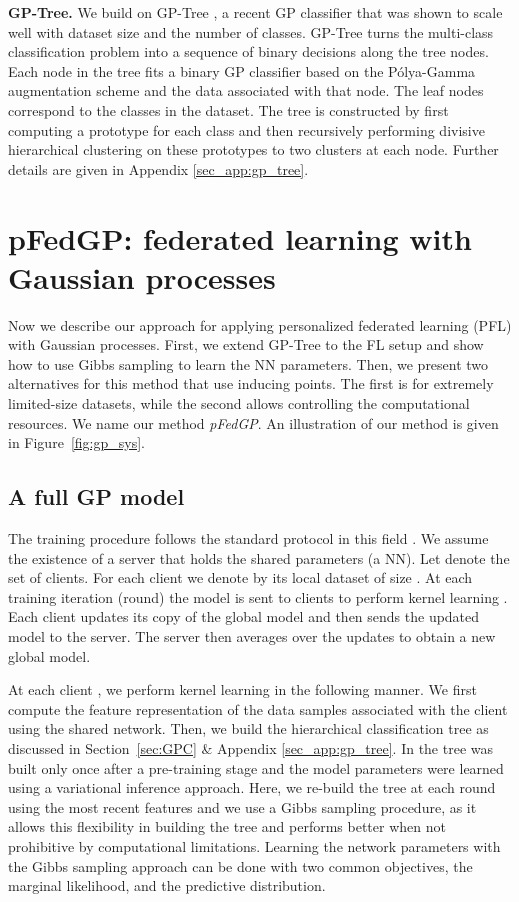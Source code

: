 \documentclass{article}
\def\Figref#1{Figure~\ref{#1}}
\def\Secref#1{Section~\ref{#1}}
\newcommand{\pg}{P\'olya-Gamma }
\begin{document}
\textbf{GP-Tree.} 
We build on GP-Tree \cite{achituve2021gp_icml}, a recent GP classifier that was shown to scale well with dataset size and the number of classes. GP-Tree turns the multi-class classification problem into a sequence of binary decisions along the tree nodes. Each node in the tree fits a binary GP classifier based on the \pg augmentation scheme and the data associated with that node. The leaf nodes correspond to the classes in the dataset. The tree is constructed by first computing a prototype for each class and then recursively performing divisive hierarchical clustering on these prototypes to two clusters at each node. Further details are given in Appendix \ref{sec_app:gp_tree}.





\section{pFedGP: federated learning with Gaussian processes} \label{sec:pFedGP}
Now we describe our approach for applying personalized federated learning (PFL) with Gaussian processes.
First, we extend GP-Tree to the FL setup and show how to use Gibbs sampling to learn the NN parameters. Then, we present two alternatives for this method that use inducing points. The first is for extremely limited-size datasets, while the second allows controlling the computational resources. We name our method \textit{pFedGP}. An illustration of our method is given in \Figref{fig:gp_sys}. 

\subsection{A full GP model} \label{sub_sec:full_gp}
The training procedure follows the standard protocol in this field \cite{arivazhagan2019federated, liang2020think, mcmahan2017communication}. We assume the existence of a server that holds the shared parameters  (a NN). 
Let  denote the set of clients. For each client  we denote by   its local dataset of size . At each training iteration (round) the model is sent to  clients to perform kernel learning . Each client  updates its copy of the global model and then sends the updated model to the server. The server then averages over the updates to obtain a new global model. 

At each client , we perform kernel learning in the following manner. We first compute the feature representation of the data samples associated with the client using the shared network. Then, we build the hierarchical classification tree as discussed in \Secref{sec:GPC} \& Appendix \ref{sec_app:gp_tree}. In \cite{achituve2021gp_icml} the tree was built only once after a pre-training stage and the model parameters were learned using a variational inference approach. Here, we re-build the tree at each round using the most recent features and we use a Gibbs sampling procedure, as it allows this flexibility in building the tree and performs better when not prohibitive by computational limitations.
Learning the network parameters  with the Gibbs sampling approach can be done with two common objectives, the marginal likelihood, and the predictive distribution. 
\end{document}
